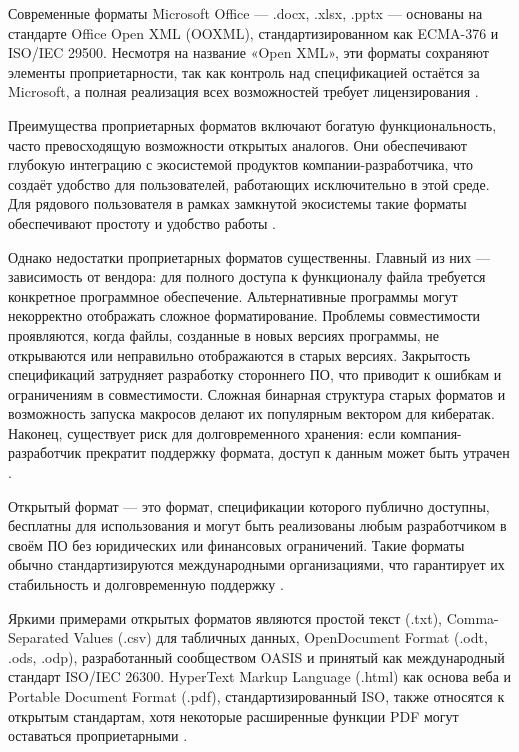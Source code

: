 \documentclass{SibFU-docs}
\begin{document}
Современные форматы Microsoft Office — .docx, .xlsx, .pptx — основаны на стандарте Office Open XML (OOXML), стандартизированном как ECMA-376 и ISO/IEC 29500. Несмотря на название «Open XML», эти форматы сохраняют элементы проприетарности, так как контроль над спецификацией остаётся за Microsoft, а полная реализация всех возможностей требует лицензирования \cite{ecma376, msft2024}.

Преимущества проприетарных форматов включают богатую функциональность, часто превосходящую возможности открытых аналогов. Они обеспечивают глубокую интеграцию с экосистемой продуктов компании-разработчика, что создаёт удобство для пользователей, работающих исключительно в этой среде. Для рядового пользователя в рамках замкнутой экосистемы такие форматы обеспечивают простоту и удобство работы \cite{gnu2024}.

Однако недостатки проприетарных форматов существенны. Главный из них — зависимость от вендора: для полного доступа к функционалу файла требуется конкретное программное обеспечение. Альтернативные программы могут некорректно отображать сложное форматирование. Проблемы совместимости проявляются, когда файлы, созданные в новых версиях программы, не открываются или неправильно отображаются в старых версиях. Закрытость спецификаций затрудняет разработку стороннего ПО, что приводит к ошибкам и ограничениям в совместимости. Сложная бинарная структура старых форматов и возможность запуска макросов делают их популярным вектором для кибератак. Наконец, существует риск для долговременного хранения: если компания-разработчик прекратит поддержку формата, доступ к данным может быть утрачен \cite{semenov2019, ivanova2021}.


Открытый формат — это формат, спецификации которого публично доступны, бесплатны для использования и могут быть реализованы любым разработчиком в своём ПО без юридических или финансовых ограничений. Такие форматы обычно стандартизируются международными организациями, что гарантирует их стабильность и долговременную поддержку \cite{odf2024, iso26300}.

Яркими примерами открытых форматов являются простой текст (.txt), Comma-Separated Values (.csv) для табличных данных, OpenDocument Format (.odt, .ods, .odp), разработанный сообществом OASIS и принятый как международный стандарт ISO/IEC 26300. HyperText Markup Language (.html) как основа веба и Portable Document Format (.pdf), стандартизированный ISO, также относятся к открытым стандартам, хотя некоторые расширенные функции PDF могут оставаться проприетарными \cite{iso32000, w3c2024}.
\end{document}
